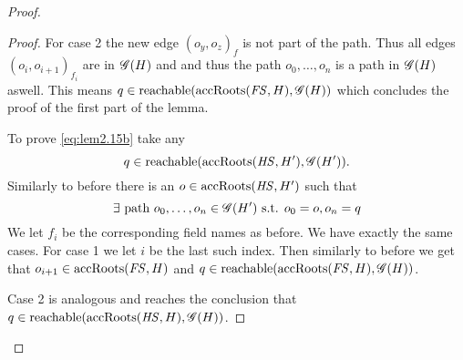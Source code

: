 \begin{proof}
\begin{description}
\begin{description}
\begin{description}
\begin{proof}
                For case 2 the new edge $(o_y, o_z)_f$ is not part of the path.
                Thus all edges $(o_i, o_{i+1})_{f_i}$ are in $\mathscr{G}(H)$ and and
                thus the path $o_0, \dots, o_n$ is a path in $\mathscr{G}(H)$ aswell.
                This means $q \in \mbox{$\mathrm{reachable}$}(\mbox{$\mathrm{accRoots}$}(\mathit{FS}, H), \mathscr{G}(H))$ which
                concludes the proof of the first part of the lemma.

                To prove \eqref{eq:lem2.15b} take any
                \begin{equation}
                  q \in \mbox{$\mathrm{reachable}$}(\mbox{$\mathrm{accRoots}$}(\mathit{HS}, H'), \mathscr{G}(H')).
                \end{equation}
                Similarly to before there is an $o \in \mbox{$\mathrm{accRoots}$}(\mathit{HS},H')$ such
                that
                \begin{equation}
                  \exists \text{ path } o_0, \dots, o_n \in \mathscr{G}(H')
                  \text{ s.t. } o_0 = o, o_n = q
                \end{equation}
                We let $f_i$ be the corresponding field names as before.
                We have exactly the same cases. For case 1 we let $i$ be the last
                such index. Then similarly to before we get that $o_{i+1} \in
                \mbox{$\mathrm{accRoots}$}(\mathit{FS}, H)$ and $q \in \mbox{$\mathrm{reachable}$}(\mbox{$\mathrm{accRoots}$}(\mathit{FS}, H),
                \mathscr{G}(H))$.
                
                Case 2 is analogous and reaches the conclusion that $q \in
                \mbox{$\mathrm{reachable}$}(\mbox{$\mathrm{accRoots}$}(\mathit{HS}, H), \mathscr{G}(H))$.


\end{proof}
\end{description}
\end{description}
\end{description}
\end{proof}
